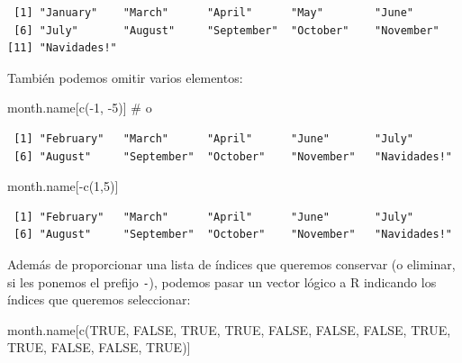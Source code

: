 \documentclass[
  letterpaper,
  DIV=11,
  numbers=noendperiod]{scrreprt}
\newenvironment{Shaded}{\begin{snugshade}}{\end{snugshade}}
\newcommand{\CommentTok}[1]{\textcolor[rgb]{0.37,0.37,0.37}{#1}}
\newcommand{\ConstantTok}[1]{\textcolor[rgb]{0.56,0.35,0.01}{#1}}
\newcommand{\DecValTok}[1]{\textcolor[rgb]{0.68,0.00,0.00}{#1}}
\newcommand{\FunctionTok}[1]{\textcolor[rgb]{0.28,0.35,0.67}{#1}}
\newcommand{\NormalTok}[1]{\textcolor[rgb]{0.00,0.23,0.31}{#1}}
\newcommand{\SpecialCharTok}[1]{\textcolor[rgb]{0.37,0.37,0.37}{#1}}
\begin{document}
\begin{verbatim}
 [1] "January"    "March"      "April"      "May"        "June"      
 [6] "July"       "August"     "September"  "October"    "November"  
[11] "Navidades!"
\end{verbatim}

También podemos omitir varios elementos:

\begin{Shaded}
\begin{Highlighting}[]
\NormalTok{month.name[}\FunctionTok{c}\NormalTok{(}\SpecialCharTok{{-}}\DecValTok{1}\NormalTok{, }\SpecialCharTok{{-}}\DecValTok{5}\NormalTok{)]  }\CommentTok{\# o }
\end{Highlighting}
\end{Shaded}

\begin{verbatim}
 [1] "February"   "March"      "April"      "June"       "July"      
 [6] "August"     "September"  "October"    "November"   "Navidades!"
\end{verbatim}

\begin{Shaded}
\begin{Highlighting}[]
\NormalTok{month.name[}\SpecialCharTok{{-}}\FunctionTok{c}\NormalTok{(}\DecValTok{1}\NormalTok{,}\DecValTok{5}\NormalTok{)]}
\end{Highlighting}
\end{Shaded}

\begin{verbatim}
 [1] "February"   "March"      "April"      "June"       "July"      
 [6] "August"     "September"  "October"    "November"   "Navidades!"
\end{verbatim}

Además de proporcionar una lista de índices que queremos conservar (o
eliminar, si les ponemos el prefijo \texttt{-}), podemos pasar un vector
lógico a R indicando los índices que queremos seleccionar:

\begin{Shaded}
\begin{Highlighting}[]
\NormalTok{month.name[}\FunctionTok{c}\NormalTok{(}\ConstantTok{TRUE}\NormalTok{, }\ConstantTok{FALSE}\NormalTok{, }\ConstantTok{TRUE}\NormalTok{, }\ConstantTok{TRUE}\NormalTok{, }\ConstantTok{FALSE}\NormalTok{, }\ConstantTok{FALSE}\NormalTok{,}
             \ConstantTok{FALSE}\NormalTok{, }\ConstantTok{TRUE}\NormalTok{, }\ConstantTok{TRUE}\NormalTok{, }\ConstantTok{FALSE}\NormalTok{, }\ConstantTok{FALSE}\NormalTok{, }\ConstantTok{TRUE}\NormalTok{)]}
\end{Highlighting}
\end{Shaded}
\end{document}
